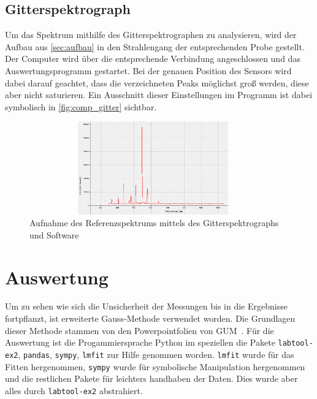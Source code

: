 \documentclass[12pt,english,ngerman]{scrartcl}
\begin{document}
\subsection{Gitterspektrograph}

Um das Spektrum mithilfe des Gitterspektrographen zu analysieren, wird der
Aufbau aus \autoref{sec:aufbau} in den Strahlengang der entsprechenden Probe
gestellt. Der Computer wird über die entsprechende Verbindung angeschlossen und
das Auswertungsprogramm gestartet. Bei der genauen Position des Sensors wird
dabei darauf geachtet, dass die verzeichneten Peaks möglichst groß werden,
diese aber nicht saturieren. Ein Ausschnitt dieser Einstellungen im Programm
ist dabei symbolisch in \autoref{fig:comp_gitter} sichtbar.

\begin{figure}[H]
	\begin{center}
		\includegraphics[width=0.95\textwidth, height=4cm]{figures/gitterSpektComp.png}
	\end{center}
	\caption{Aufnahme des Referenzspektrums mittels des Gitterspektrographs und Software
	}\label{fig:comp_gitter}
\end{figure}

\section{Auswertung}\label{sec:auswertung}

Um zu sehen wie sich die Unsicherheit der Messungen bis in die Ergebnisse
fortpflanzt, ist erweiterte Gauss-Methode verwendet worden. Die Grundlagen
dieser Methode stammen von den Powerpointfolien von
GUM~\cite{wolfgang_kessel_isobipm-gum_2004}. Für die Auswertung ist die
Progammiersprache Python im speziellen die Pakete \verb#labtool-ex2#,
\verb#pandas#, \verb#sympy#, \verb#lmfit# zur Hilfe genommen worden.
\verb#lmfit# wurde für das Fitten hergenommen, \verb#sympy# wurde für
symbolische Manipulation hergenommen und die restlichen Pakete für leichters
handhaben der Daten. Dies wurde aber alles durch \verb#labtool-ex2#
abstrahiert.
\end{document}
